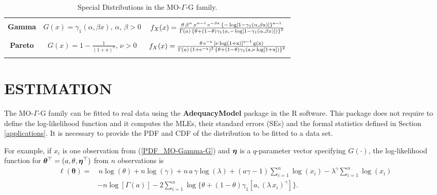 \documentclass[twoside,leqno,11pt]{article}
\newcommand{\etn}{{\mbox{\boldmath $\eta$}}}
\begin{document}
\begin{landscape}
\begin{table}[htbp]
\begin{tabular}{c|c|c}
\hline
{} & {} & {} \\
\textbf{Gamma} &  $G(x)=\gamma_1(\alpha,\beta x),\,\alpha,\,\beta>0$ & $f_{X}(x)=\frac{\theta\,\beta^{\alpha}\,x^{\alpha-1}\,\rm{e}^{-\beta x}\,\left\{ -\log[1-\gamma_1(\alpha,\beta x)] \right\}^{a-1}}{\Gamma(a)\,\left\{\theta+(1-\theta)\gamma_1\left( a, -\log \left[1-\gamma_1(\alpha,\beta x)\right]\right)\right\}^{2}}$ \\
{} & {} & {} \\                                                                                                                                                                                                                                                                           \hline
\textbf{Pareto} &  $G(x)=1-\frac{1}{(1+x)^\nu},\,\nu>0$ & $f_{X}(x)=\frac{\theta \, \rm{e}^{-x}\, \left[\nu\log(1+x)\right]^{a-1}\, g(x)}{\Gamma(a)\,(1+\rm{e}^{-x})^2\,\left\{\theta+(1-\theta)\gamma_1\left( a, \nu\log[1+x]\right)\right\}^{2}}$\\
{} & {} & {} \\
\hline
\end{tabular}
\caption{Special Distributions in the  MO-$\Gamma$-G family.}
\end{table}
\end{landscape}

\section{ESTIMATION}\label{estimation}

The  MO-$\Gamma$-G family can be  fitted to real data using the {\bf AdequacyModel} package in the {\sf R} software.
This packa\-ge does not require to define the log-likelihood function and it computes the MLEs, their standard errors (SEs)
and the formal statistics defined in Section \ref{applications}. It is necessary to provide the
PDF and CDF of the distribution to be fitted to a data set.

For example, if $x_i$ is one observation from (\ref{PDF_MO-Gamma-G}) and $\etn$ is a $q$-parameter vector specifying $G(\cdot)$,
the log-likelihood function for $\boldsymbol{\theta}^\top=(a,\theta,\etn^\top)$ from $n$ observations is
\begin{align}\label{loglik}
\ell (\boldsymbol{\theta})=&\,n\log (\theta)+n\log(\gamma)+n\, a\, \gamma \log(\lambda)+(a\gamma-1)\sum_{i=1}^n{\log(x_i)}-\lambda^\gamma\sum_{i=1}^n{\log(x_i)}\nonumber \\ &
-n\log[\Gamma(a)]-2\sum_{i=1}^n{\log\{\theta+(1-\theta)\gamma_1[a,(\lambda\,x_i)^\gamma]\}}.
\end{align}
\end{document}
